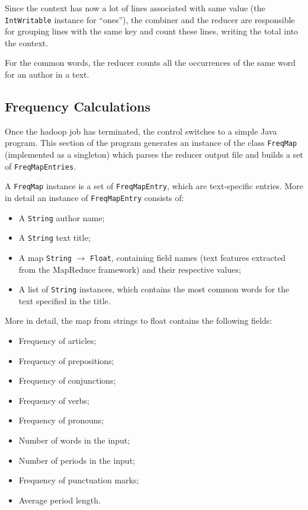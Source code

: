 \documentclass[a4paper,11pt, twoside]{article}
\begin{document}
		\noindent
		Since the context has now a lot of lines associated with same value (the \lstinline|IntWritable| instance for ``ones''), the combiner and the reducer are responsible for grouping lines with the same key and count these lines, writing the total into the context.
		
		\noindent
		For the common words, the reducer counts all the occurrences of the same word for an author in a text.
	
	\subsection{Frequency Calculations}
		Once the hadoop job has terminated, the control switches to a simple Java program. This section of the program generates an instance of the class \lstinline|FreqMap| (implemented as a singleton) which parses the reducer output file and builds a set of \lstinline|FreqMapEntries|.
		
		\noindent
		A \lstinline|FreqMap| instance is a set of \lstinline|FreqMapEntry|, which are text-specific entries. More in detail an instance of \lstinline|FreqMapEntry| consists of: \begin{itemize}
			\item A \lstinline|String| author name;
			\item A \lstinline|String| text title;
			\item A map \lstinline|String| $\to$ \lstinline|Float|, containing field names (text features extracted from the MapReduce framework) and their respective values;
			\item  A list of \lstinline|String| instances, which contains the most common words for the text specified in the title.
		\end{itemize}

		\noindent
		More in detail, the map from strings to float contains the following fields: 
		\begin{multicols}{2}
			\begin{itemize}
				\item Frequency of articles;
				\item Frequency of prepositions;
				\item Frequency of conjunctions;
				\item Frequency of verbs;
				\item Frequency of pronouns;
				\item Number of words in the input;
				\item Number of periods in the input;
				\item Frequency of punctuation marks;
				\item Average period length.
			\end{itemize}
		\end{multicols}
\end{document}
